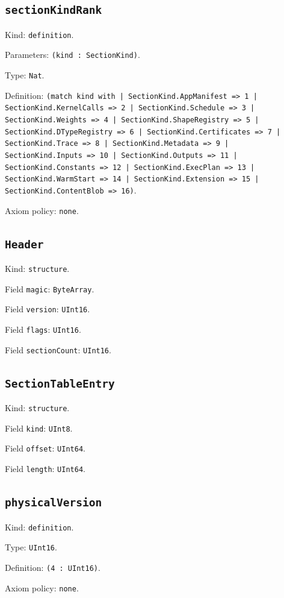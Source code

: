 \documentclass[11pt]{article}
\begin{document}
\subsection*{\texttt{sectionKindRank}}
\noindent Kind: \texttt{definition}.\par
\noindent Parameters: \texttt{(kind : SectionKind)}.\par
\noindent Type: \texttt{Nat}.\par
\noindent Definition: \texttt{(match kind with | SectionKind.AppManifest => 1 | SectionKind.KernelCalls => 2 | SectionKind.Schedule => 3 | SectionKind.Weights => 4 | SectionKind.ShapeRegistry => 5 | SectionKind.DTypeRegistry => 6 | SectionKind.Certificates => 7 | SectionKind.Trace => 8 | SectionKind.Metadata => 9 | SectionKind.Inputs => 10 | SectionKind.Outputs => 11 | SectionKind.Constants => 12 | SectionKind.ExecPlan => 13 | SectionKind.WarmStart => 14 | SectionKind.Extension => 15 | SectionKind.ContentBlob => 16)}.\par
\noindent Axiom policy: \texttt{none}.\par
\subsection*{\texttt{Header}}
\noindent Kind: \texttt{structure}.\par
\noindent Field \texttt{magic}: \texttt{ByteArray}.\par
\noindent Field \texttt{version}: \texttt{UInt16}.\par
\noindent Field \texttt{flags}: \texttt{UInt16}.\par
\noindent Field \texttt{sectionCount}: \texttt{UInt16}.\par
\subsection*{\texttt{SectionTableEntry}}
\noindent Kind: \texttt{structure}.\par
\noindent Field \texttt{kind}: \texttt{UInt8}.\par
\noindent Field \texttt{offset}: \texttt{UInt64}.\par
\noindent Field \texttt{length}: \texttt{UInt64}.\par
\subsection*{\texttt{physicalVersion}}
\noindent Kind: \texttt{definition}.\par
\noindent Type: \texttt{UInt16}.\par
\noindent Definition: \texttt{(4 : UInt16)}.\par
\noindent Axiom policy: \texttt{none}.\par
\end{document}
